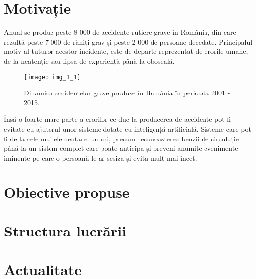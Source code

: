 \section{Motivație}

Anual se produc peste 8 000 de accidente rutiere grave în România, din care rezultă peste 7 000 de răniți grav și peste 2 000 de persoane decedate. Principalul motiv al tuturor acestor incidente, este de departe reprezentat de erorile umane, de la neatenție sau lipsa de experiență până la oboseală.
\begin{figure}[!h]
	\centering
	\texttt{[image: img\_1\_1]}
	\caption{Dinamica accidentelor grave produse în România în perioada 2001 - 2015.}
\end{figure} 

Însă o foarte mare parte a erorilor ce duc la producerea de accidente pot fi evitate cu ajutorul unor sisteme dotate cu inteligență artificială. Sisteme care pot fi de la cele mai elementare lucruri, precum recunoașterea benzii de circulație până la un sistem complet care poate anticipa și preveni anumite evenimente iminente pe care o persoană le-ar sesiza și evita mult mai încet.

\section{Obiective propuse}



\section{Structura lucrării}



\section{Actualitate}

